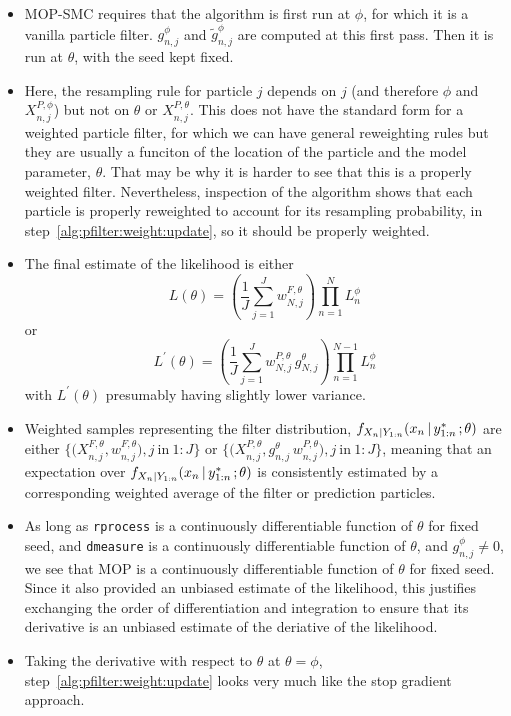 \documentclass[12p]{article}
\newcommand\giventh{{\hspace{0.5mm};\hspace{0.5mm}}}
\newcommand\seq[2]{{#1}\!:\!{#2}}
\newcommand\given{{\,\vert\,}}
\begin{document}
\begin{itemize}
\item MOP-SMC requires that the algorithm is first run at $\phi$, for which it is a vanilla particle filter.  $g^{\phi}_{n,j}$ and $\tilde g^{\phi}_{n,j}$ are computed at this first pass. Then it is run at $\theta$, with the seed kept fixed.

\item Here, the resampling rule for particle $j$ depends on $j$ (and therefore $\phi$ and $X^{P,\phi}_{n,j}$) but not on $\theta$ or  $X^{P,\theta}_{n,j}$. This does not have the standard form for a weighted particle filter, for which we can have general reweighting rules but they are usually a funciton of the location of the particle and the model parameter, $\theta$. That may be why it is harder to see that this is a properly weighted filter. Nevertheless, inspection of the algorithm shows that each particle is properly reweighted to account for its resampling probability, in step~\ref{alg:pfilter:weight:update}, so it should be properly weighted.

\item The final estimate of the likelihood is either
  \begin{equation}
    L(\theta) = \left(\frac{1}{J}\sum_{j=1}^J w^{F,\theta}_{N,j} \right)
    \prod_{n=1}^N L_n^\phi
  \end{equation}
  or
 \begin{equation}
   L^\prime(\theta) = \left(\frac{1}{J}\sum_{j=1}^J w^{P,\theta}_{N,j} \, g^{\theta}_{N,j}\right)
   \prod_{n=1}^{N-1} L_n^\phi
  \end{equation}
 with $L^\prime(\theta)$ presumably having slightly lower variance.

\item Weighted samples representing the filter distribution,
  $f_{X_n|Y_{1:n}}(x_n \given y^*_{1:n} \giventh \theta)$
  are either
  $\big\{\big(X^{F,\theta}_{n,j},w^{F,\theta}_{n,j}\big),  j\ \mathrm{in}\ \seq{1}{J}\big\}$
  or
  $\big\{\big(X^{P,\theta}_{n,j}, g^\theta_{n,j} \, w^{P,\theta}_{n,j}\big),  j\ \mathrm{in}\ \seq{1}{J}\big\}$,
  meaning that an expectation over $f_{X_n|Y_{1:n}}(x_n \given y^*_{1:n} \giventh \theta)$ is consistently estimated by a corresponding weighted average of the filter or prediction particles.

  \item As long as \texttt{rprocess} is a continuously differentiable function of $\theta$ for fixed seed, and \texttt{dmeasure} is a continuously differentiable function of $\theta$, and $g^{\phi}_{n,j}\neq 0$, we see that MOP is a continuously differentiable function of $\theta$ for fixed seed. Since it also provided an unbiased estimate of the likelihood, this justifies exchanging the order of differentiation and integration to ensure that its derivative is an unbiased estimate of the deriative of the likelihood.

  \item Taking the derivative with respect to $\theta$ at $\theta=\phi$, step~\ref{alg:pfilter:weight:update} looks very much like the stop gradient approach.

  \end{itemize}
\end{document}
